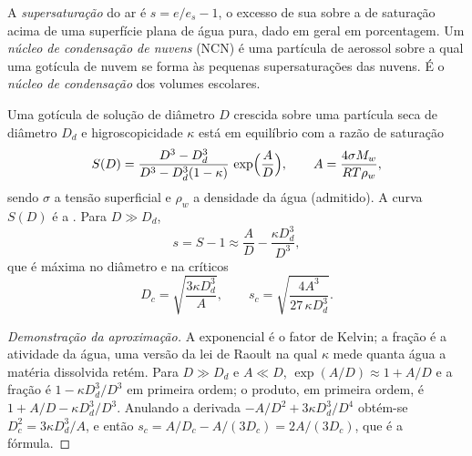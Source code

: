 \begin{definition}\label{def:b2:atmospheric-thermodynamics:microphysics}
A \emph{supersaturação} do ar é $s = e/e_s - 1$, o excesso de sua
 sobre a  de saturação acima de uma superfície plana de água pura, dado
em geral em porcentagem. Um \emph{núcleo de condensação de nuvens} (NCN)
é uma partícula de aerossol sobre a qual uma gotícula de nuvem se forma às pequenas supersaturações das nuvens.
É o \emph{núcleo de condensação} dos volumes escolares.
\end{definition}

\begin{proposition}\label{prop:b2:atmospheric-thermodynamics:kohler}
Uma gotícula de solução de diâmetro $D$ crescida sobre uma partícula seca de diâmetro $D_d$ e higroscopicidade
$\kappa$ está em equilíbrio com a razão de saturação
\[
  S(D) = \frac{D^3 - D_d^3}{D^3 - D_d^3(1 - \kappa)}\,\exp\Bigl(\frac{A}{D}\Bigr), \qquad
  A = \frac{4\sigma M_w}{R T\rho_w},
\]
sendo $\sigma$ a tensão superficial e $\rho_w$ a densidade da água (admitido). A curva $S(D)$
é a \emph{}. Para $D \gg D_d$,
\[
  s = S - 1 \approx \frac{A}{D} - \frac{\kappa D_d^3}{D^3},
\]
que é máxima no diâmetro e na  críticos
\[
  D_c = \sqrt{\frac{3\kappa D_d^3}{A}}, \qquad s_c = \sqrt{\frac{4A^3}{27\,\kappa D_d^3}} .
\]
\end{proposition}

\begin{proof}[Demonstração da aproximação]
A exponencial é o fator de Kelvin; a fração é a atividade da água, uma versão da lei de Raoult
na qual $\kappa$ mede quanta água a matéria dissolvida retém. Para $D \gg D_d$ e
$A \ll D$, $\exp(A/D) \approx 1 + A/D$ e a fração é $1 - \kappa D_d^3/D^3$ em primeira
ordem; o produto, em primeira ordem, é $1 + A/D - \kappa D_d^3/D^3$. Anulando a derivada
$-A/D^2 + 3\kappa D_d^3/D^4$ obtém-se $D_c^2 = 3\kappa D_d^3/A$, e então $s_c = A/D_c -
A/(3D_c) = 2A/(3D_c)$, que é a fórmula.
\end{proof}


